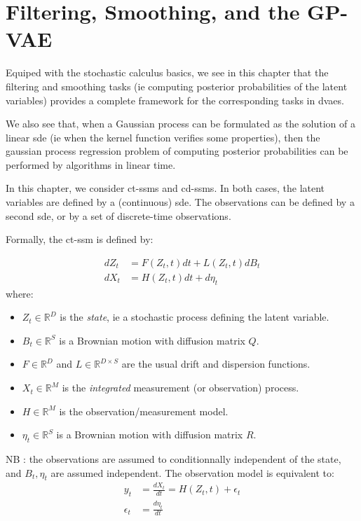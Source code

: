 \chapter{Filtering, Smoothing, and the GP-VAE}\label{sec:filter smoother gps}

Equiped with the stochastic calculus basics, we see in this chapter that the filtering and smoothing 
tasks (ie computing posterior probabilities of the latent variables) provides a complete framework 
for the corresponding tasks in \glspl{dvae}.

We also see that, when a Gaussian process can be formulated as the solution of a linear \gls{sde} (ie
 when the kernel function verifies some properties), then the gaussian process regression problem 
 of computing posterior probabilities can be performed by algorithms in linear time.

In this chapter, we consider \glspl{ct-ssm} and \glspl{cd-ssm}. In both cases, the latent variables are 
defined by a (continuous) \gls{sde}. The observations can be defined by a second \gls{sde}, or by a set of 
discrete-time observations.

Formally, the \gls{ct-ssm} is defined by:

\begin{tcolorbox}[colback=blue!5!white,colframe=black!75!black,title=Continuous-Time State Space model]
    \begin{align}
        dZ_t &= F(Z_t, t)dt + L(Z_t,t) dB_t \\
        dX_t &= H(Z_t,t)dt + d\eta_t
    \end{align}
    where:
    \begin{itemize}
        \item $Z_t \in \mathbb{R}^{D}$ is the \textit{state}, ie a stochastic process defining the latent variable.
        \item $B_t \in \mathbb{R}^{S}$ is a Brownian motion with diffusion matrix $Q$.
        \item $F \in \mathbb{R}^{D}$ and $L \in \mathbb{R}^{D \times S}$ are the usual drift and dispersion functions.
        \item $X_t \in \mathbb{R}^{M}$ is the \textit{integrated} measurement (or observation) process.
        \item $H \in \mathbb{R}^{M}$ is the observation/measurement model.
        \item $\eta_t \in \mathbb{R}^{S}$ is a Brownian motion with diffusion matrix $R$.
    \end{itemize}
    NB : the observations are assumed to conditionnally independent of the state, and $B_t, \eta_t$ are 
     assumed independent.
    The observation model is equivalent to:
    \begin{align}
        y_t &= \frac{dX_t}{dt} = H(Z_t,t) + \epsilon_t \\
        \epsilon_t &= \frac{d \eta_t}{dt}
    \end{align}
\end{tcolorbox}

